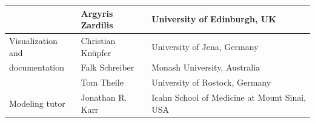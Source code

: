 \documentclass[journal,transmag]{IEEEtran}
\begin{document}
\begin{table}[ht!]
\begin{tabularx}{\textwidth}{l||l||X}
		               & Argyris Zardilis                 & University of Edinburgh, UK\\\hline
Visualization and      & Christian Kn\"upfer              & University of Jena, Germany\\
documentation          & Falk Schreiber                   & Monash University, Australia\\
                       & Tom Theile                       & University of Rostock, Germany\\\hline
Modeling tutor         & Jonathan R. Karr                 & Icahn School of Medicine at Mount Sinai, USA\\\hline
\end{tabularx}
\end{table}
\end{document}
